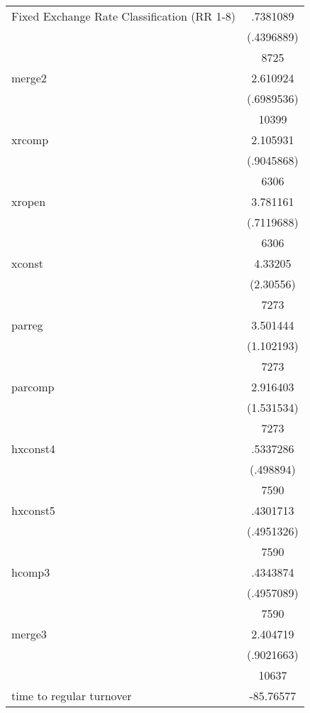 {\begin{tabular}{l*{1}{c}}
Fixed Exchange Rate Classification (RR 1-8)&    .7381089\\
                    &  (.4396889)\\
                    &        8725\\
merge2              &    2.610924\\
                    &  (.6989536)\\
                    &       10399\\
xrcomp              &    2.105931\\
                    &  (.9045868)\\
                    &        6306\\
xropen              &    3.781161\\
                    &  (.7119688)\\
                    &        6306\\
xconst              &     4.33205\\
                    &   (2.30556)\\
                    &        7273\\
parreg              &    3.501444\\
                    &  (1.102193)\\
                    &        7273\\
parcomp             &    2.916403\\
                    &  (1.531534)\\
                    &        7273\\
hxconst4            &    .5337286\\
                    &   (.498894)\\
                    &        7590\\
hxconst5            &    .4301713\\
                    &  (.4951326)\\
                    &        7590\\
hcomp3              &    .4343874\\
                    &  (.4957089)\\
                    &        7590\\
merge3              &    2.404719\\
                    &  (.9021663)\\
                    &       10637\\
time to regular turnover&   -85.76577\\

\end{tabular}}
